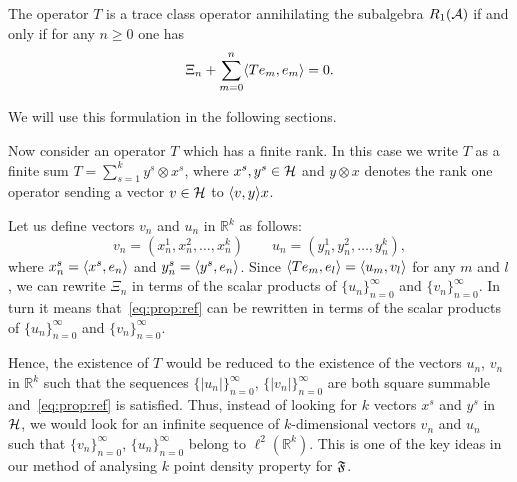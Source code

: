 \documentclass[12pt]{amsart}
\theoremstyle{case}
\begin{document}
  \begin{prop}
    \label{prop:reformulation}
    The operator $T$ is a trace class operator annihilating the subalgebra $R_1(\cal{A})$ if and only if
      for any $n \geq 0$ one has 
        \begin{equation}
          \label{eq:prop:ref}
          \Xi_n + \sum_{m=0}^n \inner{Te_m}{e_m} = 0.
        \end{equation}
  \end{prop}
    We will use this formulation in the following sections.

  \medskip
  Now consider an operator $T$ which has a finite rank.
  In this case we write $T$ as a finite sum $T = \sum_{s=1}^k y^s \otimes x^s$,
    where $x^s, y^s \in \cal{H}$ and $y \otimes x$ denotes the rank one operator sending a vector $v \in \cal{H}$
    to $\inner{v}{y}x$.

  Let us define vectors $v_n$ and $u_n$ in $\mathbb{R}^k$ as follows:
  \begin{equation*}
    v_n = (x^1_n, x^2_n, \dots, x^k_n)\qquad
    u_n = (y^1_n, y^2_n, \dots, y^k_n),
  \end{equation*}
  where $x^s_n = \inner{x^s}{e_n}$ and $y^s_n = \inner{y^s}{e_n}$.
  Since $\inner{Te_m}{e_l} = \inner{u_m}{v_l}$ for any $m$ and $l$, we can rewrite $\Xi_n$ in terms of
    the scalar products of $\{u_n\}_{n=0}^\infty$ and $\{v_n\}_{n=0}^\infty$.
  In turn it means that~\eqref{eq:prop:ref} can be rewritten in terms of the scalar products
    of $\{u_n\}_{n=0}^\infty$ and $\{v_n\}_{n=0}^\infty$.

  Hence, the existence of $T$ would be reduced to the existence of
    the vectors $u_n$, $v_n$ in $\mathbb{R}^k$ such that the sequences $\{\lvert u_n\rvert\}_{n=0}^\infty$,
    $\{\lvert v_n\rvert\}_{n=0}^\infty$ are both square summable and~\eqref{eq:prop:ref} is satisfied.
  Thus, instead of looking for $k$ vectors $x^s$ and $y^s$ in $\cal{H}$, we would look for an infinite sequence
    of $k$-dimensional vectors $v_n$ and $u_n$ such that $\{v_n \}_{n=0}^\infty$, $\{u_n\}_{n=0}^\infty$ belong to $\ell^2(\mathbb{R}^k)$.
  This is one of the key ideas in our method of analysing $k$ point density property for $\fsys$.
\end{document}

